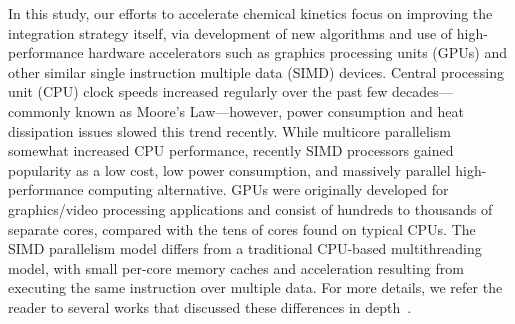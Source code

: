 \documentclass[final,twocolumn]{elsarticle}
\begin{document}
In this study, our efforts to accelerate chemical kinetics focus on improving the integration strategy itself, via development of new algorithms and use of high-performance hardware accelerators such as graphics processing units (GPUs) and other similar single instruction multiple data (SIMD) devices.
Central processing unit (CPU) clock speeds increased regularly over the past few decades---commonly known as Moore's Law---however, power consumption and heat dissipation issues slowed this trend recently.
While multicore parallelism somewhat increased CPU performance, recently SIMD processors gained popularity as a low cost, low power consumption, and massively parallel high-performance computing alternative.
GPUs were originally developed for graphics\slash video processing applications and consist of hundreds to thousands of separate cores, compared with the tens of cores found on typical CPUs.
The SIMD parallelism model differs from a traditional CPU-based multithreading model, with small per-core memory caches and acceleration resulting from executing the same instruction over multiple data.
For more details, we refer the reader to several works that discussed these differences in depth~\cite{Cruz:2011gc,Brodtkorb:2013hn,Niemeyer:2014hn}.
\end{document}

